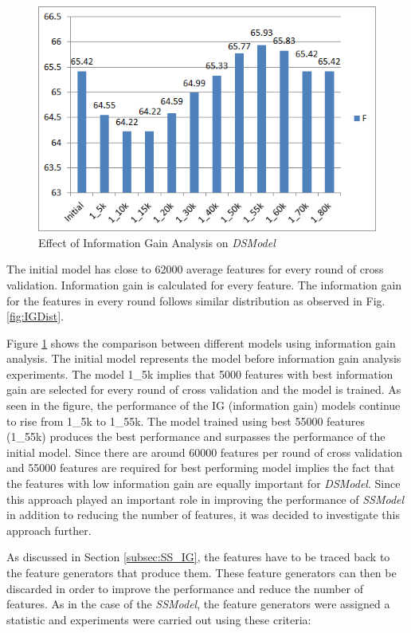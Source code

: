 \begin{figure}
\centering
\includegraphics[scale=0.7]{figures/DSIGResults.png}
\caption{Effect of Information Gain Analysis on \textit{DSModel}}\label{fig:DSIG}
\end{figure}


The initial model has close to 62000 average features for every round of cross validation. Information gain is calculated for every feature. The information gain for the features in every round follows similar distribution as observed in Fig. \ref{fig:IGDist}.

Figure \ref{fig:DSIG} shows the comparison between different models using information gain analysis. The initial model represents the model before information gain analysis experiments. The model 1\_5k implies that 5000 features with best information gain are selected for every round of cross validation and the model is trained. As seen in the figure, the performance of the IG (information gain) models continue to rise from 1\_5k to 1\_55k. The model trained using best 55000 features (1\_55k) produces the best performance and surpasses the performance of the initial model. Since there are around 60000 features per round of cross validation and 55000 features are required for best performing model implies the fact that the features with low information gain are equally important for \textit{DSModel}. Since this approach played an important role in improving the performance of \textit{SSModel} in addition to reducing the number of features, it was decided to investigate this approach further.

As discussed in Section \ref{subsec:SS_IG}, the features have to be traced back to the feature generators that produce them. These feature generators can then be discarded in order to improve the performance and reduce the number of features. As in the case of the \textit{SSModel}, the feature generators were assigned a statistic and experiments were carried out using these criteria:

